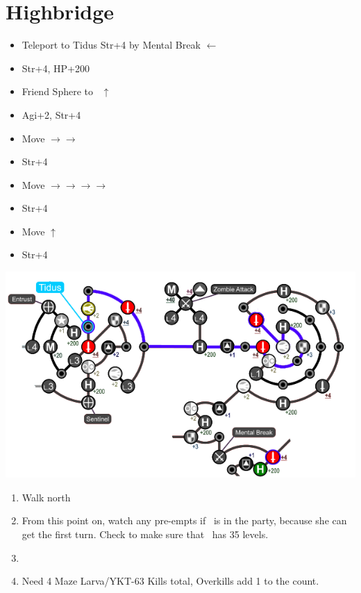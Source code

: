 \chapter{Highbridge}
\begin{spheregrid}
  \begin{itemize}
    \yunaf
          \begin{itemize}
            \item Teleport to Tidus Str+4 by Mental Break $\leftarrow$
            \item Str+4, HP+200
            \item Friend Sphere to \tidus\ $\uparrow$
            \item Agi+2, Str+4
            \item Move $\rightarrow\rightarrow$
            \item Str+4
            \item Move $\rightarrow\rightarrow\rightarrow\rightarrow$
            \item Str+4
            \item Move $\uparrow$
            \item Str+4
          \end{itemize}
          \includegraphics[width=.9\columnwidth]{graphics/Yuna_blitz_loss_highbridge_1}
  \end{itemize}
\end{spheregrid}
\begin{enumerate}
  \item Walk north
  \item From this point on, watch any pre-empts if \yuna\ is in the party, because she can get the first turn. Check to make sure that \lulu\ has 35 levels.
  \item \formation{\tidus}{\yuna}{\auron}
  \item Need 4 Maze Larva/YKT-63 Kills total, Overkills add 1 to the count.
\end{enumerate}

